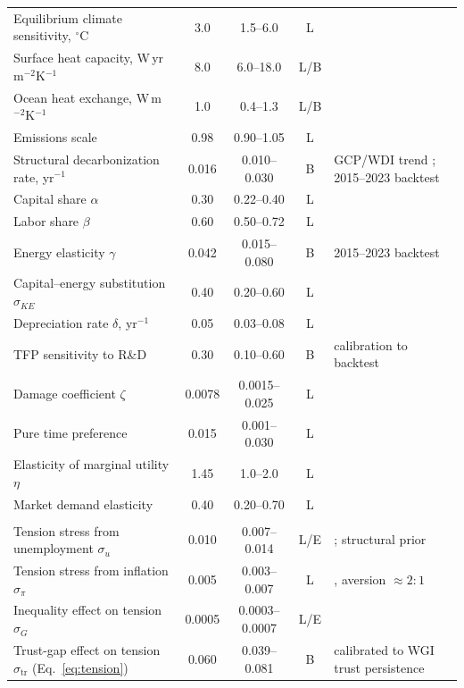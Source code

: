 \documentclass[12pt,a4paper]{article}
\newcommand{\degC}{$^{\circ}$C}
\begin{document}
\begin{xltabular}{\linewidth}{@{}>{\raggedright\arraybackslash}p{5.2cm}ccc L@{}}
Equilibrium climate sensitivity, \degC & 3.0 & 1.5--6.0 & L & \citep{ipcc_ar6_wg1,otto2013,sherwood2020} \\
Surface heat capacity, W\,yr\,m$^{-2}$K$^{-1}$ & 8.0 & 6.0--18.0 & L/B & \citep{geoffroy2013} \\
Ocean heat exchange, W\,m$^{-2}$K$^{-1}$ & 1.0 & 0.4--1.3 & L/B & \citep{geoffroy2013} \\
Emissions scale & 0.98 & 0.90--1.05 & L & \citep{friedlingstein2023} \\
Structural decarbonization rate, yr$^{-1}$ & 0.016 & 0.010--0.030 & B & GCP/WDI trend \citep{friedlingstein2023}; 2015--2023 backtest \\
Capital share $\alpha$ & 0.30 & 0.22--0.40 & L & \citep{feenstra2015,gollin2002} \\
Labor share $\beta$ & 0.60 & 0.50--0.72 & L & \citep{feenstra2015,gollin2002} \\
Energy elasticity $\gamma$ & 0.042 & 0.015--0.080 & B & 2015--2023 backtest \\
Capital--energy substitution $\sigma_{KE}$ & 0.40 & 0.20--0.60 & L & \citep{vanderwerf2008,koetse2008} \\
Depreciation rate $\delta$, yr$^{-1}$ & 0.05 & 0.03--0.08 & L & \citep{feenstra2015} \\
TFP sensitivity to R\&D & 0.30 & 0.10--0.60 & B & calibration to backtest \\
Damage coefficient $\zeta$ & 0.0078 & 0.0015--0.025 & L & \citep{howard2017,nordhaus2017,burke2015} \\
Pure time preference & 0.015 & 0.001--0.030 & L & \citep{nordhaus2017,stern2007} \\
Elasticity of marginal utility $\eta$ & 1.45 & 1.0--2.0 & L & \citep{nordhaus2017,stern2007} \\
Market demand elasticity & 0.40 & 0.20--0.70 & L & \citep{labandeira2017} \\
\midrule
{}\\
Tension stress from unemployment $\sigma_u$ & 0.010 & 0.007--0.014 & L/E & \citep{ditella2001}; structural prior \\
Tension stress from inflation $\sigma_\pi$ & 0.005 & 0.003--0.007 & L & \citep{ditella2001}, aversion ${\approx}2{:}1$ \\
Inequality effect on tension $\sigma_G$ & 0.0005 & 0.0003--0.0007 & L/E & \citep{wilkinson2009} \\
Trust-gap effect on tension $\sigma_{\mathrm{tr}}$ (Eq.~\ref{eq:tension}) & 0.060 & 0.039--0.081 & B & calibrated to WGI trust persistence \\

\end{xltabular}
\end{document}
